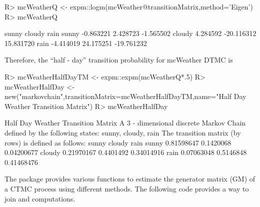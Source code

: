 \documentclass[
  nojss]{jss}
\begin{document}
\begin{CodeChunk}

\begin{CodeInput}
R> mcWeatherQ <- expm::logm(mcWeather@transitionMatrix,method='Eigen')
R> mcWeatherQ
\end{CodeInput}

\begin{CodeOutput}
           sunny     cloudy       rain
sunny  -0.863221   2.428723  -1.565502
cloudy  4.284592 -20.116312  15.831720
rain   -4.414019  24.175251 -19.761232
\end{CodeOutput}
\end{CodeChunk}

Therefore, the ``half - day'' transition probability for mcWeather DTMC is

\begin{CodeChunk}

\begin{CodeInput}
R> mcWeatherHalfDayTM <- expm::expm(mcWeatherQ*.5)
R> mcWeatherHalfDay <- new("markovchain",transitionMatrix=mcWeatherHalfDayTM,name="Half Day Weather Transition Matrix")
R> mcWeatherHalfDay
\end{CodeInput}

\begin{CodeOutput}
Half Day Weather Transition Matrix 
 A  3 - dimensional discrete Markov Chain defined by the following states: 
 sunny, cloudy, rain 
 The transition matrix  (by rows)  is defined as follows: 
            sunny    cloudy       rain
sunny  0.81598647 0.1420068 0.04200677
cloudy 0.21970167 0.4401492 0.34014916
rain   0.07063048 0.5146848 0.41468476
\end{CodeOutput}
\end{CodeChunk}

The  package \citep{pkg:ctmcd} provides various functions to estimate the generator matrix (GM) of a CTMC process using different methods. The following code provides a way to join  and  computations.
\end{document}

